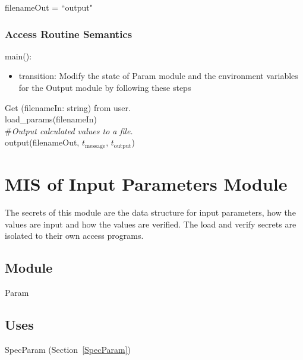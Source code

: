 \documentclass[12pt, titlepage]{article}
\begin{document}
filenameOut = ``output"

\subsubsection{Access Routine Semantics}

\noindent main():
\begin{itemize}
\item transition: Modify the state of Param module and the environment variables
  for the Output module by following these steps\\
\end{itemize}

\noindent Get (filenameIn: string) from user.\\

\noindent load\_params(filenameIn)\\

\noindent \#\textit{Output calculated values to a file.}\\



\noindent output(filenameOut, $t_\text{message}$, $t_\text{output}$)\\

\newpage

\section{MIS of Input Parameters Module} \label{Parameters}

The secrets of this module are the data structure for input parameters, how the
values are input and how the values are verified.  The load and verify secrets
are isolated to their own access programs.

\subsection{Module}

Param

\subsection{Uses}

SpecParam (Section~\ref{SpecParam})
\end{document}
